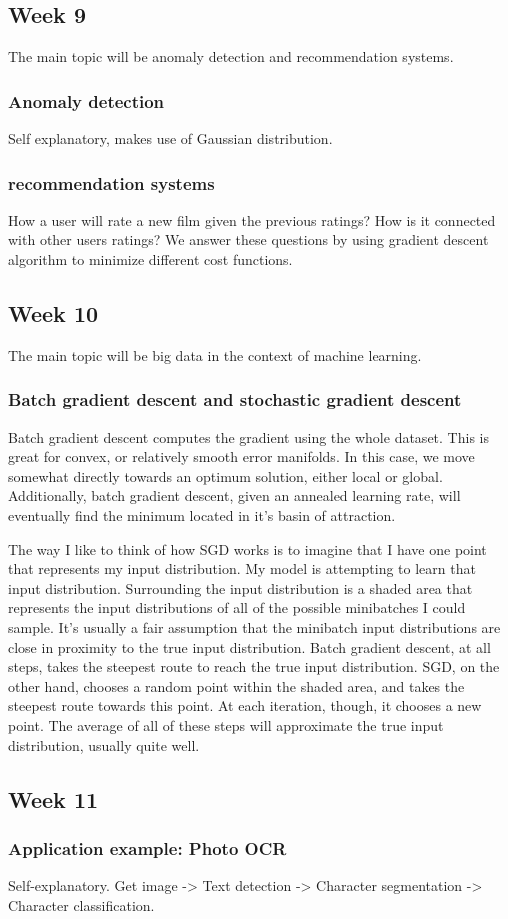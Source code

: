 \documentclass{article}
\begin{document}
\subsection{Week 9}
The main topic will be anomaly detection and recommendation systems.

\subsubsection{Anomaly detection}
Self explanatory, makes use of Gaussian distribution.

\subsubsection{recommendation systems}
How a user will rate a new film given the previous ratings? How is it connected
with other users ratings?
We answer these questions by using gradient descent algorithm to minimize
different cost functions.

\subsection{Week 10}
The main topic will be  big data in the context of machine learning.

\subsubsection{Batch gradient descent and stochastic gradient descent}

Batch gradient descent computes the gradient using the whole dataset.
This is great for convex, or relatively smooth error manifolds.
In this case, we move somewhat directly towards an optimum solution,
either local or global.
Additionally, batch gradient descent, given an annealed learning rate,
will eventually find the minimum located in it's basin of attraction.

The way I like to think of how SGD works is to imagine that I have one point
that represents my input distribution.
My model is attempting to learn that input distribution.
Surrounding the input distribution is a shaded area that represents the
input distributions of all of the possible minibatches I could sample.
It's usually a fair assumption that the minibatch input distributions are
close in proximity to the true input distribution. Batch gradient descent,
 at all steps, takes the steepest route to reach the true input distribution.
 SGD, on the other hand, chooses a random point within the shaded area, and
 takes the steepest route towards this point. At each iteration, though,
 it chooses a new point. The average of all of these steps will approximate
 the true input distribution, usually quite well.


\subsection{Week 11}
\subsubsection{Application example: Photo OCR}
Self-explanatory. Get image -> Text detection -> Character segmentation ->
Character classification. 
\end{document}
